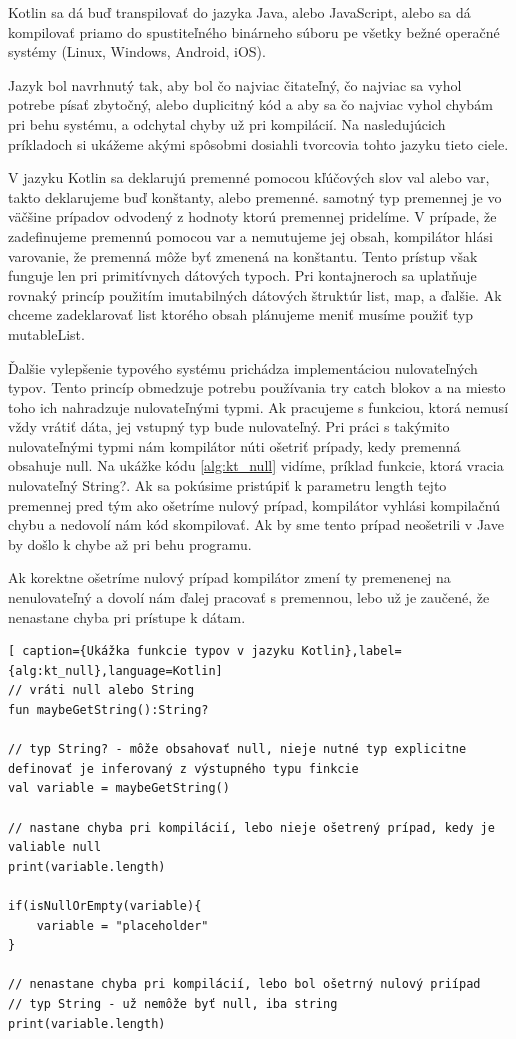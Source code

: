 Kotlin sa dá buď transpilovať do jazyka Java, alebo JavaScript, alebo sa dá kompilovať priamo do spustiteľného binárneho súboru pe všetky bežné operačné systémy (Linux, Windows, Android, iOS).

Jazyk bol navrhnutý tak, aby bol čo najviac čitateľný, čo najviac sa vyhol potrebe písať zbytočný, alebo duplicitný kód a aby sa čo najviac vyhol chybám pri behu systému, a odchytal chyby už pri kompilácií. Na nasledujúcich príkladoch si ukážeme akými spôsobmi dosiahli tvorcovia tohto jazyku tieto ciele. 

V jazyku Kotlin sa deklarujú premenné pomocou kľúčových slov val alebo var, takto deklarujeme buď konštanty, alebo premenné. samotný typ premennej je vo väčšine prípadov odvodený z hodnoty ktorú premennej pridelíme. V prípade, že zadefinujeme premennú pomocou var a nemutujeme jej obsah, kompilátor hlási varovanie, že premenná môže byť zmenená na konštantu. Tento prístup však funguje len pri primitívnych dátových typoch. Pri kontajneroch sa uplatňuje rovnaký princíp použitím imutabilných dátových štruktúr list, map, a ďalšie. Ak chceme zadeklarovať list ktorého obsah plánujeme meniť musíme použiť typ mutableList. 

Ďalšie vylepšenie typového systému prichádza implementáciou nulovateľných typov. Tento princíp obmedzuje potrebu používania try catch blokov a na miesto toho ich nahradzuje nulovateľnými typmi. Ak pracujeme s funkciou, ktorá nemusí vždy vrátiť dáta, jej vstupný typ bude nulovateľný. Pri práci s takýmito nulovateľnými typmi nám kompilátor núti ošetriť prípady, kedy premenná obsahuje null. Na ukážke kódu \ref{alg:kt_null} vidíme, príklad funkcie, ktorá vracia nulovateľný String?. Ak sa pokúsime pristúpiť k parametru length tejto premennej pred tým ako ošetríme nulový prípad, kompilátor vyhlási kompilačnú chybu a nedovolí nám kód skompilovať. Ak by sme tento prípad neošetrili v Jave by došlo k chybe až pri behu programu. 

Ak korektne ošetríme nulový prípad kompilátor zmení ty premenenej na nenulovateľný a dovolí nám ďalej pracovať s premennou, lebo už je zaučené, že nenastane chyba pri prístupe k dátam. 


\begin{lstlisting}[ caption={Ukážka funkcie typov v jazyku Kotlin},label={alg:kt_null},language=Kotlin]
// vráti null alebo String
fun maybeGetString():String?

// typ String? - môže obsahovať null, nieje nutné typ explicitne definovať je inferovaný z výstupného typu finkcie
val variable = maybeGetString()

// nastane chyba pri kompilácií, lebo nieje ošetrený prípad, kedy je valiable null
print(variable.length)

if(isNullOrEmpty(variable){
	variable = "placeholder"
}

// nenastane chyba pri kompilácií, lebo bol ošetrný nulový priípad
// typ String - už nemôže byť null, iba string
print(variable.length)
\end{lstlisting}


